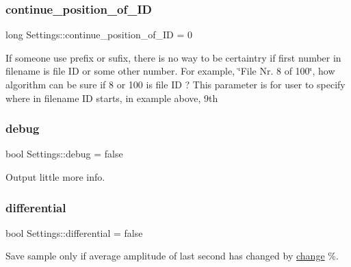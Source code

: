 \mbox{\label{class_settings_a3941f843caf6ffd81172cb42de2d0907}} 
\subsubsection{\texorpdfstring{continue\+\_\+position\+\_\+of\+\_\+\+ID}{continue\_position\_of\_ID}}
{\footnotesize\ttfamily long Settings\+::continue\+\_\+position\+\_\+of\+\_\+\+ID = 0}

If someone use prefix or sufix, there is no way to be certaintry if first number in filename is file ID or some other number. For example, \char`\"{}\+File Nr. 8 of 100\char`\"{}, how algorithm can be sure if 8 or 100 is file ID ? This parameter is for user to specify where in filename ID starts, in example above, 9th \mbox{\label{class_settings_ad9ae775f5f68995dd70b263ff006d5dd}} 
\subsubsection{\texorpdfstring{debug}{debug}}
{\footnotesize\ttfamily bool Settings\+::debug = false}



Output little more info. 

\mbox{\label{class_settings_a107556b8673e33e63d1310a73ed4aee7}} 
\subsubsection{\texorpdfstring{differential}{differential}}
{\footnotesize\ttfamily bool Settings\+::differential = false}



Save sample only if average amplitude of last second has changed by \hyperlink{class_settings_a139c6c8d809e18fec0b3aae2b6286baa}{change} \%. 

\mbox{\label{class_settings_ab9379f5abb4c1ab32f5b04638c5249a5}} 
